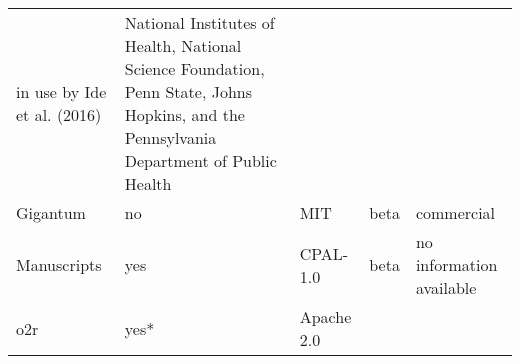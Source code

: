 \documentclass[onecolumn]{article}
\begin{document}
\begin{longtable}[]{@{}lllll@{}}
\begin{minipage}[t]{0.17\columnwidth}
in use by Ide et al. (2016)\strut
\end{minipage} & \begin{minipage}[t]{0.29\columnwidth}\raggedright
National Institutes of Health, National Science Foundation, Penn State,
Johns Hopkins, and the Pennsylvania Department of Public Health\strut
\end{minipage}\tabularnewline
\begin{minipage}[t]{0.11\columnwidth}\raggedright
Gigantum\strut
\end{minipage} & \begin{minipage}[t]{0.11\columnwidth}\raggedright
no\strut
\end{minipage} & \begin{minipage}[t]{0.17\columnwidth}\raggedright
MIT\strut
\end{minipage} & \begin{minipage}[t]{0.17\columnwidth}\raggedright
beta\strut
\end{minipage} & \begin{minipage}[t]{0.29\columnwidth}\raggedright
commercial\strut
\end{minipage}\tabularnewline
\begin{minipage}[t]{0.11\columnwidth}\raggedright
Manuscripts\strut
\end{minipage} & \begin{minipage}[t]{0.11\columnwidth}\raggedright
yes\strut
\end{minipage} & \begin{minipage}[t]{0.17\columnwidth}\raggedright
CPAL-1.0\strut
\end{minipage} & \begin{minipage}[t]{0.17\columnwidth}\raggedright
beta\strut
\end{minipage} & \begin{minipage}[t]{0.29\columnwidth}\raggedright
no information available\strut
\end{minipage}\tabularnewline
\begin{minipage}[t]{0.11\columnwidth}\raggedright
o2r\strut
\end{minipage} & \begin{minipage}[t]{0.11\columnwidth}\raggedright
yes*\strut
\end{minipage} & \begin{minipage}[t]{0.17\columnwidth}\raggedright
Apache 2.0\strut
\end{minipage} & \begin{minipage}[t]{0.17\columnwidth}\raggedright

\end{minipage}
\end{longtable}
\end{document}

